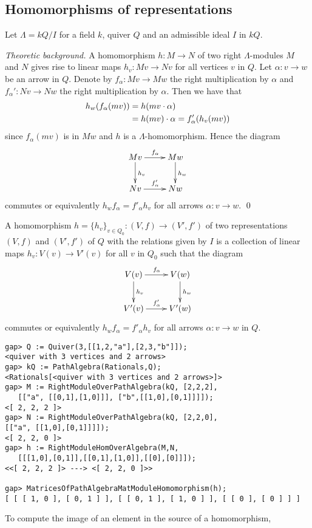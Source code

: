 \documentclass{amsart}
\renewcommand{\L}{\Lambda}
\theoremstyle{definition}
\theoremstyle{theoretic}
\newenvironment{theoback}
{\medskip\footnotesize\textit{Theoretic background.} }
{\qed\par\medskip}
\begin{document}
\subsection{Homomorphisms of representations}
Let $\L = kQ/I$ for a field $k$, quiver $Q$ and an admissible ideal
$I$ in $kQ$.  

\begin{theoback}
A homomorphism $h\colon M\to N$ of two right $\L$-modules $M$ and $N$
gives rise to linear maps $h_v\colon Mv\to Nv$ for all vertices $v$ in
$Q$.  Let $\alpha\colon v\to w$ be an arrow in $Q$.  Denote by
$f_\alpha\colon Mv\to Mw$ the right multiplication by $\alpha$ and
$f_\alpha'\colon Nv\to Nw$ the right multiplication by $\alpha$.
Then we have that
\begin{align}
h_w(f_\alpha(mv)) & = h(mv\cdot \alpha)\notag\\
& = h(mv)\cdot\alpha = f'_\alpha(h_v(mv))\notag
\end{align}
since $f_\alpha(mv)$ is in $Mw$ and $h$ is a $\L$-homomorphism.  Hence
the diagram 
\[\xymatrix{
Mv\ar[d]^{h_v}\ar[r]^{f_\alpha} &  Mw\ar[d]^{h_w}\\
Nv\ar[r]^{f'_\alpha} & Nw
}\]
commutes or equivalently $h_wf_\alpha = f'_\alpha h_v$ for all arrows
$\alpha\colon v\to w$.
\end{theoback}

A homomorphism $h=\{h_v\}_{v\in Q_0}\colon (V,f)\to (V',f')$ of two
representations $(V,f)$ and $(V',f')$ of $Q$ with the relations given
by $I$ is a collection of linear maps $h_v\colon V(v)\to V'(v)$ for
all $v$ in $Q_0$ such that the diagram 
\[\xymatrix{
V(v)\ar[d]^{h_v}\ar[r]^{f_\alpha} &  V(w)\ar[d]^{h_w}\\
V'(v)\ar[r]^{f'_\alpha} & V'(w)
}\]
commutes or equivalently $h_wf_\alpha = f'_\alpha h_v$ for all arrows
$\alpha\colon v\to w$ in $Q$.  

\begin{verbatim}
gap> Q := Quiver(3,[[1,2,"a"],[2,3,"b"]]);
<quiver with 3 vertices and 2 arrows>
gap> kQ := PathAlgebra(Rationals,Q);
<Rationals[<quiver with 3 vertices and 2 arrows>]>
gap> M := RightModuleOverPathAlgebra(kQ, [2,2,2], 
   [["a", [[0,1],[1,0]]], ["b",[[1,0],[0,1]]]]);
<[ 2, 2, 2 ]>
gap> N := RightModuleOverPathAlgebra(kQ, [2,2,0], 
[["a", [[1,0],[0,1]]]]);                     
<[ 2, 2, 0 ]>
gap> h := RightModuleHomOverAlgebra(M,N, 
   [[[1,0],[0,1]],[[0,1],[1,0]],[[0],[0]]]);             
<<[ 2, 2, 2 ]> ---> <[ 2, 2, 0 ]>>

gap> MatricesOfPathAlgebraMatModuleHomomorphism(h);                                            
[ [ [ 1, 0 ], [ 0, 1 ] ], [ [ 0, 1 ], [ 1, 0 ] ], [ [ 0 ], [ 0 ] ] ]
\end{verbatim}
To compute the image of an element in the source of a homomorphism,
\end{document}
